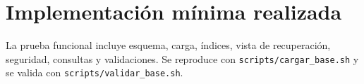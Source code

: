 \section{Implementación mínima realizada}
La prueba funcional incluye esquema, carga, índices, vista de recuperación, seguridad, consultas y validaciones. Se reproduce con \texttt{scripts/cargar\_base.sh} y se valida con \texttt{scripts/validar\_base.sh}.
